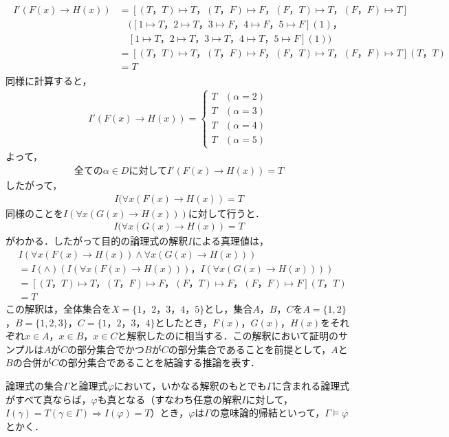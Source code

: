 \documentclass[10pt,b5paper,papersize,dvipdfmx]{jsbook}
\begin{document}
\begin{align*}
\begin{split}
I'(F(x)\to H(x))&=[(T，T)\mapsto T，(T，F)\mapsto F，(F，T)\mapsto T，(F，F)\mapsto T]\\
&\quad([1\mapsto T，2\mapsto T，3\mapsto F，4\mapsto F，5\mapsto F](1)， \\
&\quad[1\mapsto T，2\mapsto T，3\mapsto T，4\mapsto T，5\mapsto F](1))\\
&=[(T，T)\mapsto T，(T，F)\mapsto F，(F，T)\mapsto T，(F，F)\mapsto T](T，T)\\
&=T
\end{split}
\end{align*}
同様に計算すると，
\begin{align*}
I'(F(x)\to H(x))=
\begin{cases}
T&(\alpha = 2)\\
T&(\alpha = 3)\\
T&(\alpha = 4)\\
T&(\alpha = 5)
\end{cases}
\end{align*}
よって，
\begin{align*}
\mbox{全ての}\alpha \in D\mbox{に対して}I'(F(x)\to H(x))=T
\end{align*}
したがって，
\begin{align*}
I(\forall x(F(x)\to H(x))=T
\end{align*}
同様のことを$I(\forall x(G(x)\to H(x)))$に対して行うと．
\begin{align*}
I(\forall x(G(x)\to H(x))=T
\end{align*}
がわかる．したがって目的の論理式の解釈$I$による真理値は，
\begin{align*}
&I(\forall x(F(x)\to H(x))\land \forall x(G(x)\to H(x)))\\
&=I(\land)(I(\forall x(F(x)\to H(x)))，I(\forall x(G(x)\to H(x))))\\
&=[(T，T)\mapsto T，(T，F)\mapsto F，(F，T)\mapsto F，(F，F)\mapsto F](T，T)\\
&=T
\end{align*}
この解釈は，全体集合を$X=\{1，2，3，4，5\}$とし，集合$A，B，C$を$A=\{1, 2\}$，$B=\{1, 2, 3\}$，$C=\{1，2，3，4\}$としたとき，$F(x)，G(x)，H(x)$をそれぞれ$x\in A$，$x\in B$，$x\in C$と解釈したのに相当する．この解釈において証明のサンプルは$A$が$C$の部分集合でかつ$B$が$C$の部分集合であることを前提として，$A$と$B$の合併が$C$の部分集合であることを結論する推論を表す．\par
論理式の集合$\Gamma$と論理式$\varphi$において，いかなる解釈のもとでも$\Gamma$に含まれる論理式がすべて真ならば，$\varphi$も真となる（すなわち任意の解釈$I$に対して，$I(\gamma)=T(\gamma \in \Gamma)\Rightarrow I(\varphi)=T$）とき，$\varphi$は$\Gamma$の意味論的帰結といって，$\Gamma \models \varphi$とかく．
\end{document}
